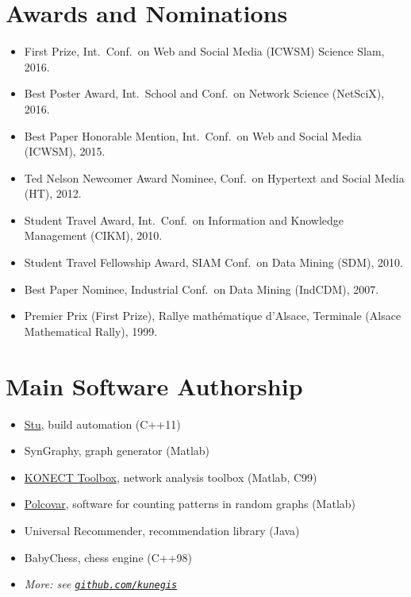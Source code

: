\documentclass[line,margin]{res}
\begin{document}
\begin{resume}
\section{Awards and Nominations}
\begin{itemize}
  \item First Prize, Int.\ Conf.\ on Web and Social Media (ICWSM) Science Slam, 2016.
  \item Best Poster Award, Int.\ School and Conf.\ on Network Science
    (NetSciX), 2016. 
  \item Best Paper Honorable Mention, Int.\ Conf.\ on Web and Social
    Media (ICWSM), 2015.  
  \item Ted Nelson Newcomer Award Nominee, Conf.\ on Hypertext and
    Social Media (HT), 2012.   
  \item Student Travel Award, Int.\ Conf.\ on Information and Knowledge
    Management (CIKM), 2010. 
  \item Student Travel Fellowship Award, SIAM Conf.\ on Data Mining (SDM),
    2010.  
  \item Best Paper Nominee, Industrial Conf.\ on Data Mining (IndCDM), 2007.    
  \item Premier Prix (First Prize), Rallye mathématique d'Alsace, Terminale (Alsace Mathematical Rally), 1999. 
\end{itemize}

\section{Main Software Authorship}
\begin{itemize}
  \item \href{https://github.com/kunegis/stu}{Stu}, build automation (C++11)
  \item SynGraphy, graph generator (Matlab)
  \item \href{http://konect.uni-koblenz.de/toolbox}{KONECT Toolbox}, network analysis toolbox (Matlab, C99)
  \item \href{https://west.uni-koblenz.de/Research/systems/polcovar}{Polcovar}, software for counting patterns in random graphs (Matlab)
  \item Universal Recommender, recommendation library (Java)
  \item BabyChess, chess engine (C++98)
  \item \emph{More:  see {\tt \href{https://github.com/kunegis}{github.com/kunegis}}}
\end{itemize}


\end{resume}
\end{document}
